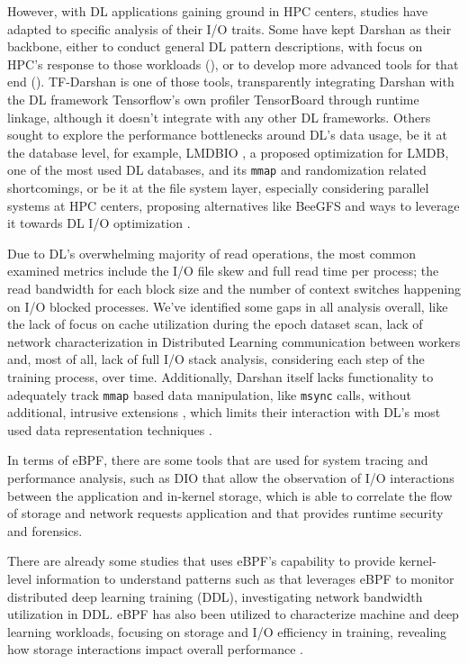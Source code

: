 \documentclass[conference]{IEEEtran}
\begin{document}
However, with DL applications gaining ground in HPC centers, studies have adapted to specific analysis of their I/O traits. Some have kept Darshan as their backbone, either to conduct general DL pattern descriptions, with focus on HPC's response to those workloads (\cite{IOHPCDLBOOK,CharacterizationMLIOLeadHPC, UnderstandingDLIOHPC}), or to develop more advanced tools for that end (\cite{DFTracerAIHPC}). TF-Darshan \cite{tfdarshan} is one of those tools, transparently integrating Darshan with the DL framework Tensorflow's own profiler TensorBoard through runtime linkage, although it doesn't integrate with any other DL frameworks. Others sought to explore the performance bottlenecks around DL's data usage, be it at the database level, for example, LMDBIO \cite{LMDB}, a proposed optimization for LMDB, one of the most used DL databases, and its \texttt{mmap} and randomization related shortcomings, or be it at the file system layer, especially considering parallel systems at HPC centers, proposing alternatives like BeeGFS \cite{beegfs} and ways to leverage it towards DL I/O optimization \cite{beegfsDL}.

Due to DL's overwhelming majority of read operations, the most common examined metrics include the I/O file skew and full read time per process; the read bandwidth for each block size and the number of context switches happening on I/O blocked processes. We've identified some gaps in all analysis overall, like the lack of focus on cache utilization during the epoch dataset scan, lack of network characterization in Distributed Learning communication between workers and, most of all, lack of full I/O stack analysis, considering each step of the training process, over time. Additionally, Darshan itself lacks functionality to adequately track \texttt{mmap} based data manipulation, like \texttt{msync} calls, without additional, intrusive extensions \cite{tfdarshan}, which limits their interaction with DL's most used data representation techniques \cite{LMDB}.

In terms of eBPF, there are some tools that are used for system tracing and performance analysis,
such as DIO \cite{DIO} that allow the observation of I/O interactions between the application and in-kernel storage,
\cite{CAT} which is able to correlate the flow of storage and network requests application and \cite{tracee} that provides runtime security and forensics.

There are already some studies that uses eBPF's capability to provide kernel-level information to understand patterns such as \cite{eBPFDLNetwork} that
leverages eBPF to monitor distributed deep learning training (DDL), investigating network bandwidth utilization in DDL.
eBPF has also been utilized to characterize machine and deep learning workloads, focusing on storage and I/O efficiency in training,
revealing how storage interactions impact overall performance \cite{OanaDL, OanaML}.
\end{document}
